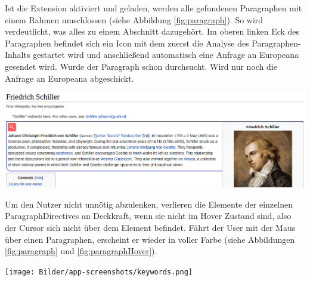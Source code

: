  Ist die Extension aktiviert und geladen, werden alle gefundenen Paragraphen mit einem Rahmen umschlossen (siehe Abbildung \ref{fig:paragraph}). So wird verdeutlicht, was alles zu einem Abschnitt dazugehört. Im oberen linken Eck des Paragraphen befindet sich ein Icon mit dem zuerst die Analyse des Paragraphen-Inhalts gestartet wird und anschließend automatisch eine Anfrage an Europeana gesendet wird. Wurde der Paragraph schon durchsucht. Wird nur noch die Anfrage an Europeana abgeschickt.

 \begin{minipage}{\linewidth}
	\centering
	\vspace*{0.5cm}
	\includegraphics[width=\linewidth]{Bilder/app-screenshots/paragraph-hovered.png}
	\label{fig:paragraphHover}
	\vspace*{0.5cm}
 \end{minipage}

 Um den Nutzer nicht unnötig abzulenken, verlieren die Elemente der einzelnen ParagraphDirectives an Deckkraft, wenn sie nicht im Hover Zustand sind, also der Cursor sich nicht über dem Element befindet. Fährt der User mit der Maus über einen Paragraphen, erscheint er wieder in voller Farbe (siehe Abbildungen \ref{fig:paragraph} und \ref{fig:paragraphHover}).

 \begin{minipage}{\linewidth}
	\centering
	\vspace*{0.5cm}
	\texttt{[image: Bilder/app-screenshots/keywords.png]}
	\label{fig:keywords}
	\vspace*{0.5cm}
 \end{minipage}

